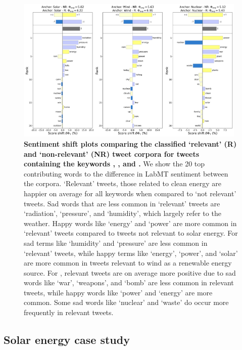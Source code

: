 \begin{figure}
  \centering	
    \includegraphics[width=0.98\textwidth]{figures/combined_shifts.png}  
  \caption{
    \textbf{Sentiment shift plots comparing the classified `relevant' (R) and `non-relevant' (NR) tweet corpora for tweets containing the keywords , , and .}
    We show the 20 top contributing words to the difference in LabMT sentiment between the corpora.
    `Relevant' tweets, those related to clean energy are happier on average for all keywords when compared to `not relevant' tweets. 
    Sad words that are less common in `relevant'  tweets are `radiation', `pressure', and `humidity', which largely refer to the weather. Happy words like `energy' and `power' are more common in `relevant' tweets compared to tweets not relevant to solar energy. For  sad terms like `humidity' and `pressure' are less common in `relevant' tweets, while happy terms like `energy', `power', and `solar' are more common in tweets relevant to wind as a renewable energy source. For , relevant tweets are on average more positive due to sad words like `war', `weapons', and `bomb' are less common in relevant tweets, while happy words like `power' and `energy' are more common. Some sad words like `nuclear' and `waste' do occur more frequently in relevant tweets.
  }    
  \label{fig:combined_sentiment_shifts}

\end{figure}



\subsection{Solar energy case study}
\label{sec:corpusCreation.results.solar}


